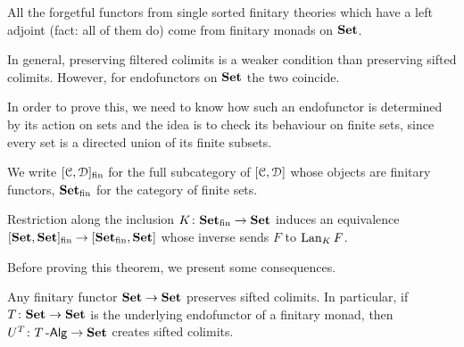 \documentclass[a4paper,11pt,oneside,openany]{scrbook}
\begin{document}
\begin{exmp}
	All the forgetful functors from single sorted finitary theories which have a left adjoint (fact: all of them do) come from finitary monads on ${\normalfont\textbf{Set}}$.
\end{exmp}

In general, preserving filtered colimits is a weaker condition than preserving sifted colimits. However, for endofunctors on ${\normalfont\textbf{Set}}$ the two coincide.

In order to prove this, we need to know how such an endofunctor is determined by its action on sets and the idea is to check its behaviour on finite sets, since every set is a directed union of its finite subsets.

We write $[\operatorname{\mathcal{C}},\operatorname{\mathcal{D}}]_\text{fin}$ for the full subcategory of $[\operatorname{\mathcal{C}},\operatorname{\mathcal{D}}]$ whose objects are finitary functors, ${\normalfont\textbf{Set}}_\text{fin}$ for the category of finite sets.

\begin{thm}
	Restriction along the inclusion $K\colon{\normalfont\textbf{Set}}_\text{fin}\rightarrow{\normalfont\textbf{Set}}$
	induces an equivalence
	$[{\normalfont\textbf{Set}},{\normalfont\textbf{Set}}]_\text{fin}\rightarrow[{\normalfont\textbf{Set}}_\text{fin},{\normalfont\textbf{Set}}]$ whose inverse
	sends $F$ to $\operatorname{Lan}_KF$.
\end{thm}

Before proving this theorem, we present some consequences.

\begin{cor}
	Any finitary functor ${\normalfont\textbf{Set}}\rightarrow{\normalfont\textbf{Set}}$ preserves sifted colimits. In particular, if $T\colon{\normalfont\textbf{Set}}\rightarrow{\normalfont\textbf{Set}}$ is the underlying endofunctor of a finitary monad, then $U^T\colon T\operatorname{-\mathsf{Alg}}\rightarrow{\normalfont\textbf{Set}}$ creates sifted colimits.
\end{cor}
\end{document}
